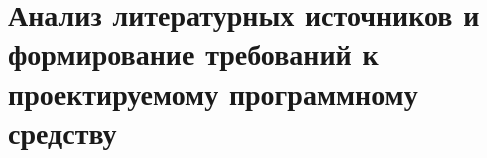 \section{Анализ литературных источников и формирование
требований к проектируемому программному средству}
\label{sec:analysis}